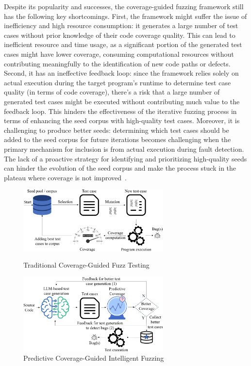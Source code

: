 Despite its popularity and successes, the coverage-guided fuzzing
framework still has the following key shortcomings. First, the
framework might suffer the issue of inefficiency and high resource
consumption: it generates a large number of test cases without prior
knowledge of their code coverage quality. This can lead to inefficient
resource and time usage, as a significant portion of the generated
test cases might have lower coverage, consuming computational
resources without contributing meaningfully to the identification of
new code paths or defects. Second, it has an ineffective feedback
loop: since the framework relies solely on actual execution during the
target program's runtime to determine test case quality (in terms of
code coverage), there's a risk that a large number of generated test
cases might be executed without contributing much value to
the feedback loop. This hinders the effectiveness of the iterative
fuzzing process in terms of enhancing the seed corpus with
high-quality test cases. Moreover, it is challenging to produce better
seeds: determining which test cases should be added to the seed corpus
for future iterations becomes challenging when the primary mechanism
for inclusion is from actual execution during fault detection. The
lack of a proactive strategy for identifying and prioritizing
high-quality seeds can hinder the evolution of the seed corpus and
make the process stuck in the plateau where coverage is not
improved~\cite{gao2023beyond}.

\begin{figure}[t]
    \centering
    \begin{minipage}{0.5\textwidth}
        \centering
        \includegraphics[width=3in]{coverage-fuzz.png}
        \caption{Traditional Coverage-Guided Fuzz Testing}
        \label{fig:coverage-fuzz}
    \end{minipage}%
    \begin{minipage}{0.5\textwidth}
        \centering
        \includegraphics[width=3in]{fuzzwise2.png}
        \caption{Predictive Coverage-Guided Intelligent Fuzzing}
        \label{fig:fuzzwise}
    \end{minipage}
\end{figure}

